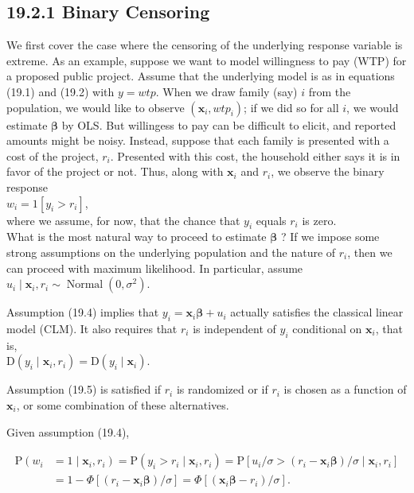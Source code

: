 \documentclass[10pt]{article}
\begin{document}
\subsection*{19.2.1 Binary Censoring}
We first cover the case where the censoring of the underlying response variable is extreme. As an example, suppose we want to model willingness to pay (WTP) for a proposed public project. Assume that the underlying model is as in equations (19.1) and (19.2) with $y=w t p$. When we draw family (say) $i$ from the population, we would like to observe $\left(\mathbf{x}_{i}, w t p_{i}\right)$; if we did so for all $i$, we would estimate $\boldsymbol{\beta}$ by OLS. But willingess to pay can be difficult to elicit, and reported amounts might be noisy. Instead, suppose that each family is presented with a cost of the project, $r_{i}$. Presented with this cost, the household either says it is in favor of the project or not. Thus, along with $\mathbf{x}_{i}$ and $r_{i}$, we observe the binary response\\
$w_{i}=1\left[y_{i}>r_{i}\right]$,\\
where we assume, for now, that the chance that $y_{i}$ equals $r_{i}$ is zero.\\
What is the most natural way to proceed to estimate $\boldsymbol{\beta}$ ? If we impose some strong assumptions on the underlying population and the nature of $r_{i}$, then we can proceed with maximum likelihood. In particular, assume\\
$u_{i} \mid \mathbf{x}_{i}, r_{i} \sim \operatorname{Normal}\left(0, \sigma^{2}\right)$.

Assumption (19.4) implies that $y_{i}=\mathbf{x}_{i} \boldsymbol{\beta}+u_{i}$ actually satisfies the classical linear model (CLM). It also requires that $r_{i}$ is independent of $y_{i}$ conditional on $\mathbf{x}_{i}$, that is,\\
$\mathrm{D}\left(y_{i} \mid \mathbf{x}_{i}, r_{i}\right)=\mathrm{D}\left(y_{i} \mid \mathbf{x}_{i}\right)$.

Assumption (19.5) is satisfied if $r_{i}$ is randomized or if $r_{i}$ is chosen as a function of $\mathbf{x}_{i}$, or some combination of these alternatives.

Given assumption (19.4),


\begin{align*}
\mathrm{P}\left(w_{i}\right. & \left.=1 \mid \mathbf{x}_{i}, r_{i}\right)=\mathrm{P}\left(y_{i}>r_{i} \mid \mathbf{x}_{i}, r_{i}\right)=\mathrm{P}\left[u_{i} / \sigma>\left(r_{i}-\mathbf{x}_{i} \boldsymbol{\beta}\right) / \sigma \mid \mathbf{x}_{i}, r_{i}\right] \\
& =1-\Phi\left[\left(r_{i}-\mathbf{x}_{i} \boldsymbol{\beta}\right) / \sigma\right]=\Phi\left[\left(\mathbf{x}_{i} \boldsymbol{\beta}-r_{i}\right) / \sigma\right] . \tag{19.6}
\end{align*}
\end{document}
